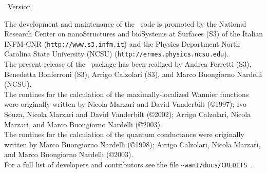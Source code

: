 
\thispagestyle{empty}
\begin{centering}
{\LARGE \WANT\ Version \WANTVERSION}\\
\end{centering}
\vspace{0.35in}

 The development and  maintenance of the
\WANT\ code is promoted by the National Research Center on
nanoStructures and bioSystems at Surfaces (S3) of the Italian
INFM-CNR (\texttt{http://www.s3.infm.it}) and the Physics Department North
Carolina State University (NCSU) (\texttt{http://ermes.physics.ncsu.edu}). \\

\noindent The present release of the \WANT\ package has been
realized by Andrea Ferretti (S3), Benedetta Bonferroni (S3), Arrigo Calzolari (S3), 
and Marco Buongiorno Nardelli (NCSU). \\

\noindent The routines for the calculation of the
maximally-localized Wannier functions were originally written by
Nicola Marzari and David Vanderbilt (\copyright 1997);  Ivo Souza,
Nicola Marzari and David Vanderbilt (\copyright 2002); Arrigo
Calzolari, Nicola Marzari, and Marco Buongiorno Nardelli (\copyright 2003).\\

\noindent The routines for the calculation of the quantum
conductance were originally written by Marco Buongiorno Nardelli
(\copyright 1998); Arrigo Calzolari, Nicola Marzari, and
Marco Buongiorno Nardelli (\copyright 2003).\\

\noindent For a full list of developers and contributors see the file
\texttt{\~{}want/docs/CREDITS }. \\
 \vspace{0.25in}

